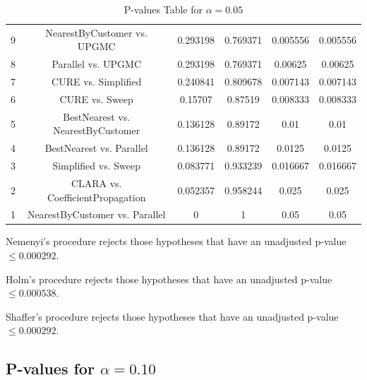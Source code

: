 \documentclass[a4paper,10pt]{article}
\begin{document}
\begin{landscape}
\begin{table}[!htp]
\begin{tabular}{cccccc}
9&NearestByCustomer vs. UPGMC&0.293198&0.769371&0.005556&0.005556\\
8&Parallel vs. UPGMC&0.293198&0.769371&0.00625&0.00625\\
7&CURE vs. Simplified&0.240841&0.809678&0.007143&0.007143\\
6&CURE vs. Sweep&0.15707&0.87519&0.008333&0.008333\\
5&BestNearest vs. NearestByCustomer&0.136128&0.89172&0.01&0.01\\
4&BestNearest vs. Parallel&0.136128&0.89172&0.0125&0.0125\\
3&Simplified vs. Sweep&0.083771&0.933239&0.016667&0.016667\\
2&CLARA vs. CoefficientPropagation&0.052357&0.958244&0.025&0.025\\
1&NearestByCustomer vs. Parallel&0&1&0.05&0.05\\
\hline
\end{tabular}
\caption{P-values Table for $\alpha=0.05$}
\end{table}Nemenyi's procedure rejects those hypotheses that have an unadjusted p-value $\le0.000292$.

Holm's procedure rejects those hypotheses that have an unadjusted p-value $\le0.000538$.

Shaffer's procedure rejects those hypotheses that have an unadjusted p-value $\le0.000292$.

\pagebreak

\subsection{P-values for $\alpha=0.10$}


\end{landscape}
\end{document}
